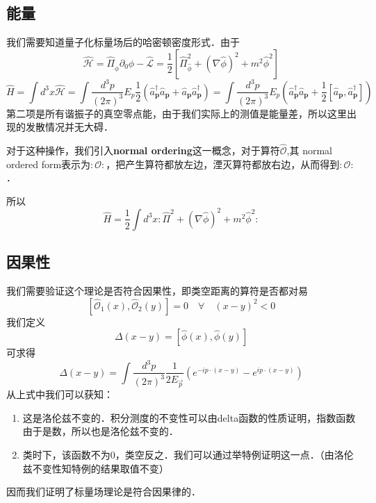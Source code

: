 \subsection{能量}
我们需要知道量子化标量场后的哈密顿密度形式．由于
\begin{equation}
\hat{\mathcal{H}}=\hat{\Pi}_{\hat{\phi}} \partial_{0} \hat{\phi}-\hat{\mathcal{L}}=\frac{1}{2}\left[\hat{\Pi}_{\hat{\phi}}^{2}+(\nabla \hat{\phi})^{2}+m^{2} \hat{\phi}^{2}\right]
\end{equation}
\begin{equation}
\hat{H}=\int d^{3} x \hat{\mathcal{H}}=\int \frac{d^{3} p}{(2 \pi)^{3}} E_{p} \frac{1}{2}\left(\hat{a}_{\mathbf{p}}^{\dagger} \hat{a}_{\mathbf{p}}+\hat{a}_{\mathbf{p}} \hat{a}_{\mathbf{p}}^{\dagger}\right)=\int \frac{d^{3} p}{(2 \pi)^{3}} E_{p}\left(\hat{a}_{\mathbf{p}}^{\dagger} \hat{a}_{\mathbf{p}}+\frac{1}{2}\left[\hat{a}_{\mathbf{p}}, \hat{a}_{\mathbf{p}}^{\dagger}\right]\right)
\end{equation}
第二项是所有谐振子的真空零点能，由于我们实际上的测值是能量差，所以这里出现的发散情况并无大碍．

对于这种操作，我们引入\textbf{normal ordering}这一概念，对于算符$\hat{\mathcal{O}}$,其 normal ordered form表示为$:\mathcal{O}:$，把产生算符都放左边，湮灭算符都放右边，从而得到$:\mathcal{O}:$．

所以
\begin{equation}
\hat{H}=\frac{1}{2} \int d^{3} x: \hat{\Pi}^{2}+(\nabla \hat{\phi})^{2}+m^{2} \hat{\phi}^{2}:
\end{equation}
\subsection{因果性}
我们需要验证这个理论是否符合因果性，即类空距离的算符是否都对易
\begin{equation}
\left[\mathcal{\hat{O}}_{1}(x), \mathcal{\hat{O}}_{2}(y)\right]=0 \quad \forall \quad(x-y)^{2}<0
\end{equation}
我们定义
\begin{equation}
\Delta(x-y)=[\hat{\phi}(x), \hat{\phi}(y)]
\end{equation}
可求得
\begin{equation}
\Delta(x-y)=\int \frac{d^{3} p}{(2 \pi)^{3}} \frac{1}{2 E_{\vec{p}}}\left(e^{-i p \cdot(x-y)}-e^{i p \cdot(x-y)}\right)
\end{equation}
从上式中我们可以获知：
\begin{enumerate}
\item 这是洛伦兹不变的．积分测度的不变性可以由delta函数的性质证明，指数函数由于是数，所以也是洛伦兹不变的．
\item 类时下，该函数不为0，类空反之．我们可以通过举特例证明这一点．（由洛伦兹不变性知特例的结果取值不变）
\end{enumerate}
因而我们证明了标量场理论是符合因果律的．
